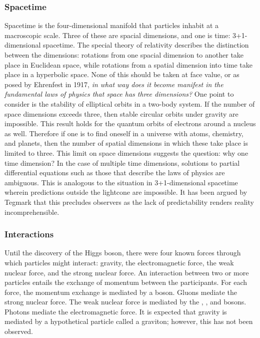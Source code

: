 \subsubsection{Spacetime}

Spacetime is the four-dimensional manifold that particles inhabit at a macroscopic scale.
Three of these are spacial dimensions, and one is time: 3+1-dimensional spacetime. 
The special theory of relativity describes the distinction between the dimensions: rotations from one spacial dimension to another take place in Euclidean space, while rotations from a spatial dimension into time take place in a hyperbolic space.
None of this should be taken at face value, or as posed by Ehrenfest in 1917, \emph{in what way does it become manifest in the fundamental laws of physics that space has three dimensions?} 
One point to consider is the stability of elliptical orbits in a two-body system.
If the number of space dimensions exceeds three, then stable circular orbits under gravity are impossible.
This result holds for the quantum orbits of electrons around a nucleus as well. 
Therefore if one is to find oneself in a universe with atoms, chemistry, and planets, then the number of spatial dimensions in which these take place is limited to three. \cite{ehrenfest}
This limit on space dimensions suggests the question: why one time dimension?
In the case of multiple time dimensions, solutions to partial differential equations such as those that describe the laws of physics are ambiguous.
This is analogous to the situation in 3+1-dimensional spacetime wherein predictions outside the lightcone are impossible.
It has been argued by Tegmark that this precludes observers as the lack of predictability renders reality incomprehensible.\cite{tegmark-time}


\subsubsection{Interactions}
Until the discovery of the Higgs boson, there were four known forces through which particles might interact: gravity, the electromagnetic force, the weak nuclear force, and the strong nuclear force.
An interaction between two or more particles entails the exchange of momentum between the participants.
For each force, the momentum exchange is mediated by a boson.
Gluons mediate the strong nuclear force.
The weak nuclear force is mediated by the \Wp, \Wm, and \Z bosons.
Photons mediate the electromagnetic force.
It is expected that gravity is mediated by a hypothetical particle called a graviton; however, this has not been observed.

